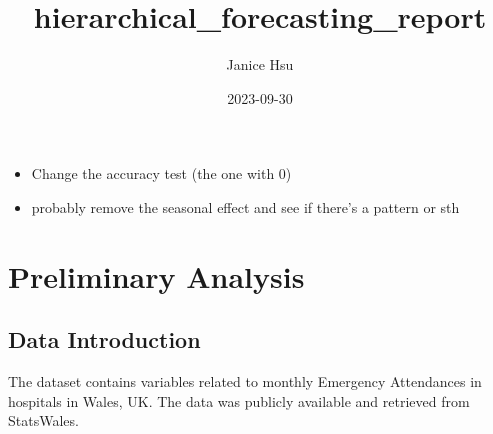 \documentclass[
]{article}
\title{hierarchical\_forecasting\_report}
\author{Janice Hsu}
\date{2023-09-30}
\providecommand{\tightlist}{%
  \setlength{\itemsep}{0pt}\setlength{\parskip}{0pt}}
\begin{document}
\maketitle

{
\setcounter{tocdepth}{2}
\tableofcontents
}
\begin{itemize}
\tightlist
\item
  Change the accuracy test (the one with 0)
\item
  probably remove the seasonal effect and see if there's a pattern or sth
\end{itemize}

\newpage

\hypertarget{preliminary-analysis}{%
\section{Preliminary Analysis}\label{preliminary-analysis}}

\hypertarget{data-introduction}{%
\subsection{Data Introduction}\label{data-introduction}}

The dataset contains variables related to monthly Emergency Attendances in hospitals in Wales, UK. The data was publicly available and retrieved from StatsWales.
\end{document}
